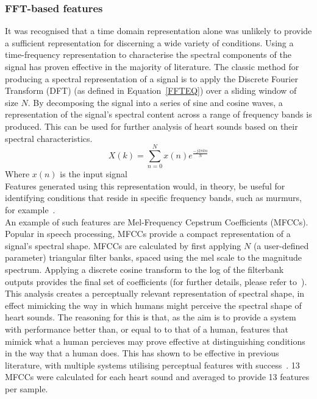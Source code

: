 \documentclass[titlepage, 12pt]{scrartcl} \usepackage{enumitem}
\begin{document}
\subsubsection{FFT-based features}\label{FFT}
It was recognised that a time domain representation alone was unlikely to
provide a sufficient representation for discerning a wide variety of
conditions. Using a time-frequency representation to characterise the spectral
components of the signal has proven effective in the majority of literature.
The classic method for producing a spectral representation of a signal is to
apply the Discrete Fourier Transform (DFT) (as defined in Equation~\ref{FFTEQ})
over a sliding window of size $N$. By decomposing the signal into a series of
sine and cosine waves, a representation of the signal's spectral content across
a range of frequency bands is produced. This can be used for further analysis
of heart sounds based on their spectral characteristics.
\begin{equation}\label{FFTEQ}
X(k)=\sum\limits_{n=0}^{N}x(n)e^{\frac{-j2\pi kn}{N}}
\end{equation}
Where $x(n)$ is the input signal\\
Features generated using this representation would, in theory, be useful for
identifying conditions that reside in specific frequency bands, such as
murmurs, for example~\parencite{Sepehri2010}.\\

An example of such features are Mel-Frequency Cepstrum Coefficients (MFCCs).
Popular in speech processing, MFCCs provide a compact representation of a
signal's spectral shape. MFCCs are calculated by first applying $N$ (a
user-defined parameter) triangular filter banks, spaced using the mel scale to
the magnitude spectrum. Applying a discrete cosine transform to the log of the
filterbank outputs provides the final set of coefficients (for further details,
please refer to~\parencite{Lerch2012}). This analysis
creates a perceptually relevant representation of spectral shape, in effect
mimicking the way in which humans might perceive the spectral shape of heart
sounds. The reasoning for this is that, as the aim is to provide a system with
performance better than, or equal to to that of a human, features that mimick
what a human percieves may prove effective at distinguishing conditions in the
way that a human does. This has shown to be effective in previous literature,
with multiple systems utilising perceptual features with
success~\parencite{Ortiz2016, Rubin2016, Quiceno-Manrique2010a}. 13 MFCCs were
calculated for each heart sound and averaged to provide 13 features
per sample.\\
\end{document}

